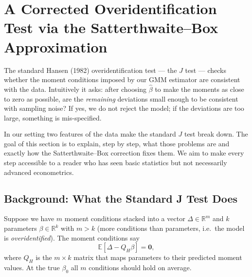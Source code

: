 %

\section{A Corrected Overidentification Test via the
         Satterthwaite--Box Approximation}
\label{sec:jtest}

The standard Hansen (1982) overidentification test --- the $J$ test ---
checks whether the moment conditions imposed by our GMM estimator are
consistent with the data.  Intuitively it asks: after choosing $\hat\beta$
to make the moments as close to zero as possible, are the
\emph{remaining} deviations small enough to be consistent with sampling
noise?  If yes, we do not reject the model; if the deviations are too
large, something is mis-specified.

In our setting two features of the data make the standard $J$ test break
down.  The goal of this section is to explain, step by step, what those
problems are and exactly how the Satterthwaite--Box correction fixes them.
We aim to make every step accessible to a reader who has seen basic
statistics but not necessarily advanced econometrics.

\subsection{Background: What the Standard J Test Does}
\label{subsec:jtest_standard}

Suppose we have $m$ moment conditions stacked into a vector
$\Delta \in \mathbb{R}^m$ and $k$ parameters $\beta \in \mathbb{R}^k$
with $m > k$ (more conditions than parameters, i.e.\ the model is
\emph{overidentified}).  The moment conditions say
\begin{equation}
  \mathbb{E}[\Delta - Q_H\beta] = \mathbf{0},
  \label{eq:moments}
\end{equation}
where $Q_H$ is the $m\times k$ matrix that maps parameters to their
predicted moment values.  At the true $\beta_0$ all $m$ conditions
should hold on average.

